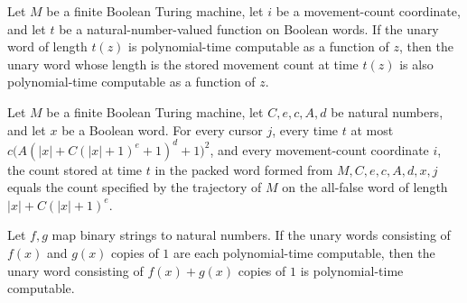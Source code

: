 \begin{lemma}
\label{Complexity.clA5Count_native}
\leanok
{}
Let $M$ be a finite Boolean Turing machine, let $i$ be a movement-count coordinate, and
let $t$ be a natural-number-valued function on Boolean words. If the unary word of
length $t(z)$ is polynomial-time computable as a function of $z$, then the unary word
whose length is the stored movement count at time $t(z)$ is also polynomial-time
computable as a function of $z$.
\end{lemma}

\begin{lemma}
\label{Complexity.clA5Count_exact}
\leanok
{}
Let $M$ be a finite Boolean Turing machine, let $C,e,c,A,d$ be natural numbers, and let
$x$ be a Boolean word. For every cursor $j$, every time $t$ at most
$c\bigl(A(|x|+C(|x|+1)^e+1)^d+1\bigr)^2$, and every movement-count coordinate $i$, the
count stored at time $t$ in the packed word formed from $M,C,e,c,A,d,x,j$ equals the
count specified by the trajectory of $M$ on the all-false word of length
$|x|+C(|x|+1)^e$.
\end{lemma}

\begin{lemma}
\label{Complexity.clA5Add_native}
\leanok
{}
Let $f,g$ map binary strings to natural numbers. If the unary words consisting of $f(x)$
and $g(x)$ copies of $1$ are each polynomial-time computable, then the unary word
consisting of $f(x)+g(x)$ copies of $1$ is polynomial-time computable.
\end{lemma}

